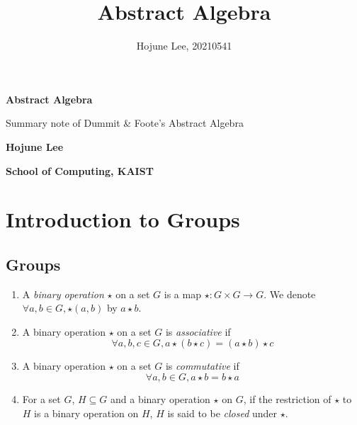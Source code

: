 \documentclass[12pt, a4paper, openany, twoside]{book}
\author{Hojune Lee, 20210541}
\title{Abstract Algebra}
\theoremstyle{definition}
\theoremstyle{remark}
\theoremstyle{plain}
\numberwithin{equation}{section}
\begin{document}
\begin{titlepage}
    \begin{center}
        \vspace*{9cm}
            
        \Huge
        \textbf{Abstract Algebra}
    
        \vspace{1cm}
        \large
        Summary note of Dummit \& Foote's Abstract Algebra
        \vspace{3cm}
        
        \LARGE
        \textbf{Hojune Lee}
            
        \vspace{8cm}
            
        \normalsize
        \textbf{School of Computing, KAIST}\\  
    \end{center}
\end{titlepage}

\hypersetup{linkcolor=black}
\tableofcontents
\hypersetup{linkcolor=blue}

\newpage 

\chapter{Introduction to Groups}

\section{Groups}

\begin{tcolorbox}[colback=yellow!10!white,colframe=brown!75!black,title=Binary operation]

\begin{enumerate}
    \item A \textit{binary operation} $\star$ on a set $G$ is a map $\star : G \times G \rightarrow G$. We denote $\forall a, b \in G, \star(a, b)$ by $a \star b$. 
    \item A binary operation $\star$ on a set $G$ is \textit{associative} if \[\forall a, b, c \in G, a \star (b \star c) = (a \star b) \star c\]
    \item A binary operation $\star$ on a set $G$ is \textit{commutative} if \[\forall a, b \in G, a \star b = b \star a\]
    \item For a set $G$, $H \subseteq G$ and a binary operation $\star$ on $G$, if the restriction of $\star$ to $H$ is a binary operation on $H$, $H$ is said to be \textit{closed} under $\star$. 
\end{enumerate}

\end{tcolorbox}
\end{document}
